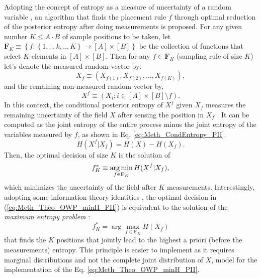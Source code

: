 Adopting the concept of entropy as a measure of uncertainty of a random variable \citep{cover_2006}, an algorithm that finds the placement rule $f$ through optimal reduction of the {posterior} entropy after doing measurements is proposed.  For any given number $K\leq A \cdot B$ of sample positions to be taken, let $\mathbf{F}_K \equiv \left\{ f:\left\{1,..,k,.., K \right\} \rightarrow [A] \times [B] \right\}$ be the collection of functions that select $K$-elements in $[A]\times[B]$. Then for any $f \in  \mathbf{F}_K$ (sampling rule of size $K$) let's denote the measured random vector by: 
\begin{equation}\label{eq:Meth_Theo_Xf_PII}
X_{f} \equiv ( X_{f(1)},X_{f(2)}, \ldots ,X_{f(K)}) ,
\end{equation}
and the remaining non-measured random vector by, 
\begin{equation}\label{eq:Meth_Theo_Xfc_PII}
X^f \equiv (X_{ i }: i \in [A]\times [B] \setminus f ) .
\end{equation}
In this context, the conditional posterior entropy of $X^f$ given $X_f$ measures the remaining uncertainty of the field $X$ after sensing the position in $X_{f}$ \citep{cover_2006}. It can be computed as the joint entropy of the entire process minus the joint entropy of the variables measured by $f$, as shown in Eq. \eqref{eq:Meth_CondEntropy_PII}.
\begin{equation}
\label{eq:Meth_CondEntropy_PII}
H(X^f|X_f) = H(X) - H(X_f) .
\end{equation}
Then, the optimal decision of size $K$ is the solution of 
\begin{equation} \label{eq:Meth_Theo_OWP_minH_PII}
f_{K}^{*} \equiv \operatorname*{arg\,min}_{f \in \mathbf{F}_K} H(X^f|X_{f}),
\end{equation}
which minimizes the uncertainty of the field after $K$ measurements. 
Interestingly, adopting some information theory identities \citep{cover_2006}, 
the optimal decision in (\ref{eq:Meth_Theo_OWP_minH_PII}) is equivalent to the solution of the 
{\em maximum entropy problem} \citep{Santibanez2019_a}: 
\begin{equation}\label{eq_sec_owp_9_PII}
f^*_K = \arg \max_{f\in \mathbf{F}_K} 	H({X}_f) 
\end{equation}
that finds the $K$ positions that jointly lead to the highest a priori (before the measurements) entropy. This principle is easier to implement as it requires marginal distributions and not the complete joint distribution of $X$, model for the implementation of the Eq. \eqref{eq:Meth_Theo_OWP_minH_PII}. 


